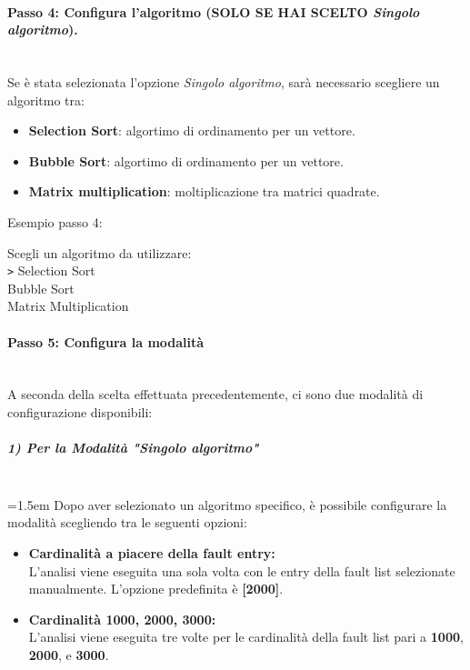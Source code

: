 \documentclass{article}
\begin{document}
\paragraph{Passo 4: Configura l'algoritmo (SOLO SE HAI SCELTO \textit{Singolo algoritmo}).}\leavevmode\\
Se è stata selezionata l'opzione \textit{Singolo algoritmo}, sarà necessario scegliere un algoritmo tra:
\begin{itemize}
    \item \textbf{Selection Sort}: algortimo di ordinamento per un vettore.
    \item \textbf{Bubble Sort}: algortimo di ordinamento per un vettore.
    \item \textbf{Matrix multiplication}: moltiplicazione tra matrici quadrate.  
\end{itemize}
Esempio passo 4:
\begin{tcolorbox}[colback=black, coltext=white, sharp corners, boxrule=0.5mm, width=\textwidth]
    Scegli un algoritmo da utilizzare: \\
    \texttt{>} Selection Sort \\
    \hspace{2.5em}Bubble Sort \\
    \hspace{2.5em}Matrix Multiplication
\end{tcolorbox}


\paragraph{Passo 5: Configura la modalità}\leavevmode\\
A seconda della scelta effettuata precedentemente, ci sono due modalità di configurazione disponibili:

\subparagraph{1) Per la Modalità "Singolo algoritmo"}\leavevmode\\
\hangindent=1.5em   
Dopo aver selezionato un algoritmo specifico, è possibile configurare la modalità scegliendo tra le seguenti opzioni:
\begin{itemize}
    \item \textbf{Cardinalità a piacere della fault entry:}\\
    L'analisi viene eseguita una sola volta con le entry della fault list selezionate manualmente. L'opzione predefinita è \textbf{[2000]}.
    \item \textbf{Cardinalità 1000, 2000, 3000:}\\
    L'analisi viene eseguita tre volte per le cardinalità della fault list pari a \textbf{1000}, \textbf{2000}, e \textbf{3000}.
\end{itemize}
\end{document}
